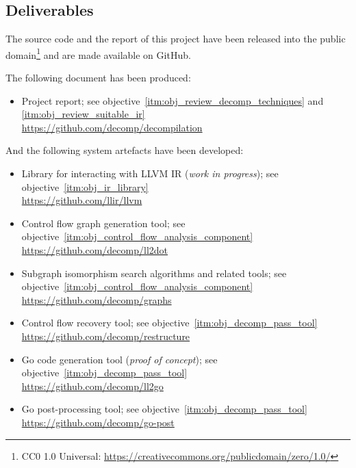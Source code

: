 
\subsection{Deliverables}
\label{sec:intro_deliverables}

The source code and the report of this project have been released into the public domain\footnote{CC0 1.0 Universal: \url{https://creativecommons.org/publicdomain/zero/1.0/}} and are made available on GitHub.

The following document has been produced:

\begin{itemize}
	\item Project report; see objective~\ref{itm:obj_review_decomp_techniques} and \ref{itm:obj_review_suitable_ir} \\ \url{https://github.com/decomp/decompilation}
\end{itemize}

And the following system artefacts have been developed:

\begin{itemize}
	\item Library for interacting with LLVM IR (\textit{work in progress}); see objective~\ref{itm:obj_ir_library} \\ \url{https://github.com/llir/llvm}
	\item Control flow graph generation tool; see objective~\ref{itm:obj_control_flow_analysis_component} \\ \url{https://github.com/decomp/ll2dot}
	\item Subgraph isomorphism search algorithms and related tools; see objective~\ref{itm:obj_control_flow_analysis_component} \\ \url{https://github.com/decomp/graphs}
	\item Control flow recovery tool; see objective~\ref{itm:obj_decomp_pass_tool} \\ \url{https://github.com/decomp/restructure}
	\item Go code generation tool (\textit{proof of concept}); see objective~\ref{itm:obj_decomp_pass_tool} \\ \url{https://github.com/decomp/ll2go}
	\item Go post-processing tool; see objective~\ref{itm:obj_decomp_pass_tool} \\ \url{https://github.com/decomp/go-post}
\end{itemize}
